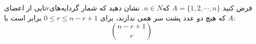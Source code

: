 \EXERCISE
فرض کنید
$A = \{1, 2, \cdots, n\}$
که$n \in N$. نشان دهید که شمار گردایه‌های$r$تایی از اعضای
$A$
که هیچ دو عدد پشت سر همی ندارند، برای
$0 \leq r \leq n - r + 1$
برابر است با:
$$\binom{n - r + 1}{r}$$